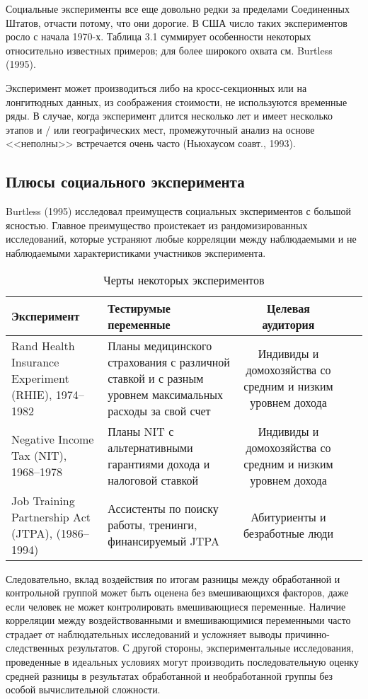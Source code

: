 Социальные эксперименты все еще довольно редки за пределами Соединенных Штатов, отчасти потому, что они дорогие. В США число таких экспериментов росло с начала 1970-х. Таблица 3.1 суммирует особенности некоторых относительно известных примеров; для более широкого охвата см. Burtless (1995).


Эксперимент может производиться либо на кросс-секционных или на лонгитюдных данных, из соображения стоимости, не используются временные ряды. В случае, когда эксперимент длится несколько лет и имеет несколько этапов и / или географических мест, промежуточный анализ на основе <<неполны>> встречается очень часто (Ньюхаусом соавт., 1993).



\subsection{Плюсы социального эксперимента}


Burtless (1995) исследовал преимуществ социальных экспериментов с большой ясностью. Главное преимущество проистекает из рандомизированных исследований, которые устраняют любые корреляции между наблюдаемыми и не наблюдаемыми характеристиками участников эксперимента.

\begin{table}[h]
\begin{center}
\caption{\label{tab:pred}Черты некоторых экспериментов}
\begin{tabular}[t]{llcll|}
\hline
\bf{Эксперимент} & \bf{Тестирумые переменные} & \bf{Целевая аудитория} \\
\hline
Rand Health Insurance Experiment (RHIE), 1974–1982 & Планы медицинского страхования с различной ставкой и с разным уровнем максимальных расходы за свой счет  & Индивиды и домохозяйства со средним и низким уровнем дохода \\
Negative Income Tax (NIT), 1968–1978 & Планы NIT с альтернативными гарантиями дохода и налоговой ставкой & Индивиды и домохозяйства со средним и низким уровнем дохода \\
Job Training Partnership Act (JTPA), (1986–1994)& Ассистенты по поиску работы, тренинги, финансируемый JTPA & Абитуриенты и безработные люди\\
\hline
\end{tabular}
\end{center}
\end{table}

Следовательно, вклад воздействия по итогам разницы между обработанной и контрольной группой может быть оценена без вмешивающихся факторов, даже если человек не может контролировать вмешивающиеся переменные. Наличие корреляции между воздействованными и вмешивающимися переменными часто страдает от наблюдательных исследований и усложняет выводы причинно-следственных результатов. С другой стороны, экспериментальные исследования, проведенные в идеальных условиях могут производить последовательную оценку средней разницы в результатах обработанной и необработанной группы без особой вычислительной сложности.


